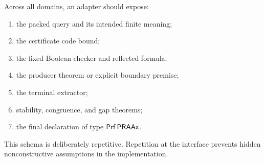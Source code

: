 Across all domains, an adapter should expose:

\begin{enumerate}
\item the packed query and its intended finite meaning;
\item the certificate code bound;
\item the fixed Boolean checker and reflected formula;
\item the producer theorem or explicit boundary premise;
\item the terminal extractor;
\item stability, congruence, and gap theorems;
\item the final declaration of type \(\mathsf{Prf}\,\mathsf{PRAAx}\).
\end{enumerate}

This schema is deliberately repetitive.  Repetition at the interface prevents
hidden nonconstructive assumptions in the implementation.
